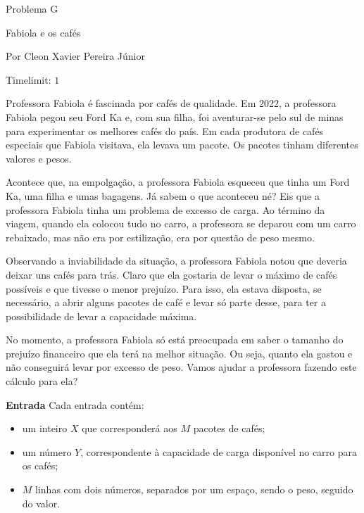 \begin{center}
Problema G

Fabiola e os cafés

{\tiny Por Cleon Xavier Pereira Júnior}

Timelimit: $1$	
\end{center}			

{\footnotesize
Professora Fabiola é fascinada por cafés de qualidade. Em 2022, a professora Fabiola pegou seu Ford Ka e, com sua filha, foi aventurar-se pelo sul de minas para experimentar os melhores cafés do país. Em cada produtora de cafés especiais que Fabiola visitava, ela levava um pacote. Os pacotes tinham diferentes valores e pesos. 

Acontece que, na empolgação, a professora Fabiola esqueceu que tinha um Ford Ka, uma filha e umas bagagens. Já sabem o que aconteceu né? Eis que a professora Fabiola tinha um problema de excesso de carga. Ao término da viagem, quando ela colocou tudo no carro, a professora se deparou com um carro rebaixado, mas não era por estilização, era por questão de peso mesmo. 

Observando a inviabilidade da situação, a professora Fabiola notou que deveria deixar uns cafés para trás. Claro que ela gostaria de levar o máximo de cafés possíveis e que tivesse o menor prejuízo. Para isso, ela estava disposta, se necessário, a abrir alguns pacotes de café e levar só parte desse, para ter a possibilidade de levar a capacidade máxima.

No momento, a professora Fabiola só está preocupada em saber o tamanho do prejuízo financeiro que ela terá na melhor situação. Ou seja, quanto ela gastou e não conseguirá levar por excesso de peso. Vamos ajudar a professora fazendo este cálculo para ela?


\vspace{0.3cm}
\textbf{Entrada}
Cada entrada contém:
\begin{itemize}
    \item um inteiro $X$ que corresponderá aos $M$ pacotes de cafés;
    \item um número $Y$, correspondente à capacidade de carga disponível no carro para os cafés;
    \item $M$ linhas com dois números, separados por um espaço, sendo o peso, seguido do valor.
\end{itemize}

}
